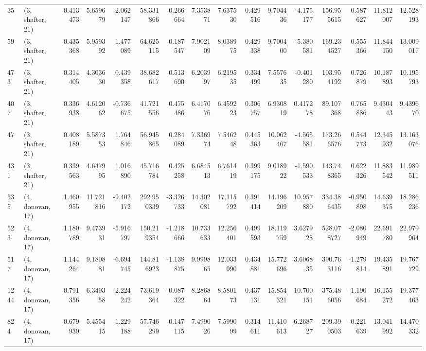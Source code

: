 \begin{tabular}{llrrrrrrrrrrrrrr}
35   &  (3, shafter, 21) &   0.413473 &   5.659679 &   2.062147 &     58.331866 &    0.266664 &    7.353871 &    7.637530 &  0.429516 &   9.704436 &  -4.175177 &   156.955615 &   0.587627 &  11.812007 &  12.528193 \\
59   &  (3, shafter, 21) &   0.435368 &   5.959392 &   1.477089 &     64.625115 &    0.187547 &    7.902109 &    8.038975 &  0.429338 &   9.700400 &  -5.380581 &   169.234527 &   0.555366 &  11.844150 &  13.009017 \\
473  &  (3, shafter, 21) &   0.314405 &   4.303630 &   0.439358 &     38.682617 &    0.513690 &    6.203997 &    6.219535 &  0.334499 &   7.557635 &  -0.401280 &   103.954192 &   0.726879 &  10.187893 &  10.195793 \\
407  &  (3, shafter, 21) &   0.336938 &   4.612062 &  -0.736675 &     41.721556 &    0.475486 &    6.417076 &    6.459223 &  0.306757 &   6.930819 &   0.417278 &    89.107368 &   0.765886 &   9.430443 &   9.439670 \\
47   &  (3, shafter, 21) &   0.408189 &   5.587353 &   1.764846 &     56.945865 &    0.284089 &    7.336974 &    7.546248 &  0.445363 &  10.062467 &  -4.565581 &   173.266576 &   0.544773 &  12.345932 &  13.163076 \\
431  &  (3, shafter, 21) &   0.339563 &   4.647995 &   1.016890 &     45.716784 &    0.425258 &    6.684513 &    6.761419 &  0.399175 &   9.018922 &  -1.590533 &   143.748365 &   0.622326 &  11.883542 &  11.989511 \\
535  &  (4, donovan, 17) &   1.460955 &  11.721816 &  -9.402172 &    292.950339 &   -3.326733 &   14.302081 &   17.115792 &  0.391414 &  14.196209 &  10.957880 &   334.386435 &  -0.950898 &  14.639375 &  18.286236 \\
523  &  (4, donovan, 17) &   1.180789 &   9.473931 &  -5.916797 &    150.219354 &   -1.218666 &   10.733633 &   12.256401 &  0.499593 &  18.119759 &   3.627928 &   528.078727 &  -2.080949 &  22.691780 &  22.979964 \\
517  &  (4, donovan, 17) &   1.144264 &   9.180881 &  -6.694745 &    144.816923 &   -1.138875 &    9.999865 &   12.033990 &  0.434881 &  15.772696 &   3.606835 &   390.763116 &  -1.279814 &  19.435891 &  19.767729 \\
1244 &  (4, donovan, 17) &   0.791356 &   6.349358 &  -2.224242 &     73.619364 &   -0.087322 &    8.286864 &    8.580173 &  0.437131 &  15.854321 &  10.700151 &   375.486056 &  -1.190684 &  16.155272 &  19.377463 \\
824  &  (4, donovan, 17) &   0.679939 &   5.455415 &  -1.229188 &     57.746299 &    0.147115 &    7.499026 &    7.599099 &  0.314611 &  11.410613 &   6.268727 &   209.390503 &  -0.221639 &  13.041992 &  14.470332 \\

\end{tabular}
